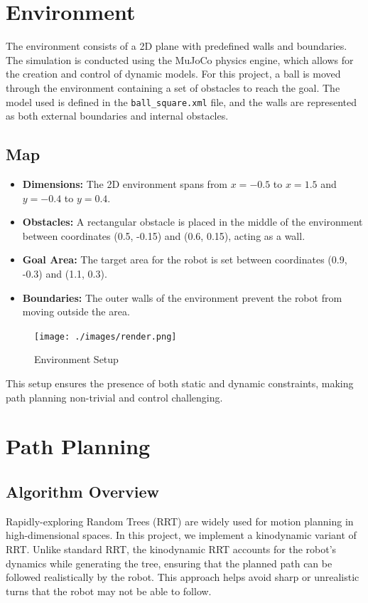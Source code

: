 \documentclass[12pt]{article}
\begin{document}
\section{Environment}
The environment consists of a 2D plane with predefined walls and boundaries. The simulation is conducted using the MuJoCo physics engine, which allows for the creation and control of dynamic models. For this project, a ball is moved through the environment containing a set of obstacles to reach the goal. The model used is defined in the \texttt{ball\_square.xml} file, and the walls are represented as both external boundaries and internal obstacles.

\subsection{Map}
\begin{itemize}
    \item \textbf{Dimensions:} The 2D environment spans from \(x = -0.5\) to \(x = 1.5\) and \(y = -0.4\) to \(y = 0.4\).
    \item \textbf{Obstacles:} A rectangular obstacle is placed in the middle of the environment between coordinates (0.5, -0.15) and (0.6, 0.15), acting as a wall.
    \item \textbf{Goal Area:} The target area for the robot is set between coordinates (0.9, -0.3) and (1.1, 0.3).
    \item \textbf{Boundaries:} The outer walls of the environment prevent the robot from moving outside the area.
\end{itemize}

\begin{figure}[h]
    \centering
    \texttt{[image: ./images/render.png]}
    \caption{Environment Setup}
    \label{fig:environment}
\end{figure}

This setup ensures the presence of both static and dynamic constraints, making path planning non-trivial and control challenging.

\section{Path Planning}

\subsection{Algorithm Overview}
Rapidly-exploring Random Trees (RRT) are widely used for motion planning in high-dimensional spaces. In this project, we implement a kinodynamic variant of RRT. Unlike standard RRT, the kinodynamic RRT accounts for the robot’s dynamics while generating the tree, ensuring that the planned path can be followed realistically by the robot. This approach helps avoid sharp or unrealistic turns that the robot may not be able to follow.
\end{document}

